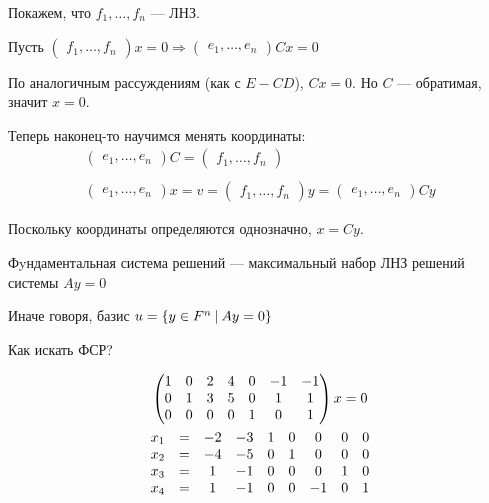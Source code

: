 Покажем, что \( f_1, \ldots, f_n \) --- ЛНЗ.

Пусть
\(
    \begin{pmatrix}
        f_1, \ldots, f_n
    \end{pmatrix}
    x
    =
    0
    \Rightarrow
    \begin{pmatrix}
        e_1, \ldots, e_n
    \end{pmatrix}
    Cx
    =
    0
\)

По аналогичным рассуждениям (как с \( E - CD \)), \( Cx = 0 \).
Но \( C \) --- обратимая, значит \( x = 0 \).

Теперь наконец-то научимся менять координаты:
\begin{gather*}
    \begin{pmatrix}
        e_1, \ldots, e_n
    \end{pmatrix}
    C
    =
    \begin{pmatrix}
        f_1, \ldots, f_n
    \end{pmatrix}
    \\
    \\
    \begin{pmatrix}
        e_1, \ldots, e_n
    \end{pmatrix}
    x
    =
    v
    =
    \begin{pmatrix}
        f_1, \ldots, f_n
    \end{pmatrix}
    y
    =
    \begin{pmatrix}
        e_1, \ldots, e_n
    \end{pmatrix}
    Cy
\end{gather*}

Поскольку координаты определяются однозначно, \( x = Cy \).

\begin{defn}{}{}
    Фyндаментальная система решений --- максимальный набор ЛНЗ решений системы \( Ay = 0 \)

    Иначе говоря, базис \( u = \{ y \in F^n \ \vline \ Ay = 0 \} \)
\end{defn}

Как искать ФСР?

\begin{gather*}
    \begin{pmatrix}
        1 & 0 & 2 & 4 & 0 & -1 & -1
        \\
        0 & 1 & 3 & 5 & 0 & 1 & 1
        \\
        0 & 0 & 0 & 0 & 1 & 0 & 1
    \end{pmatrix}
    x = 0
    \\
    \begin{array}{c c c c c c c c c}
        x_1 & = & -2 & -3 & 1 & 0 & 0 & 0 & 0
        \\
        x_2 & = & -4 & -5 & 0 & 1 & 0 & 0 & 0
        \\
        x_3 & = & 1 & -1 & 0 & 0 & 0 & 1 & 0
        \\
        x_4 & = & 1 & -1 & 0 & 0 & -1 & 0 & 1
    \end{array}
\end{gather*}

